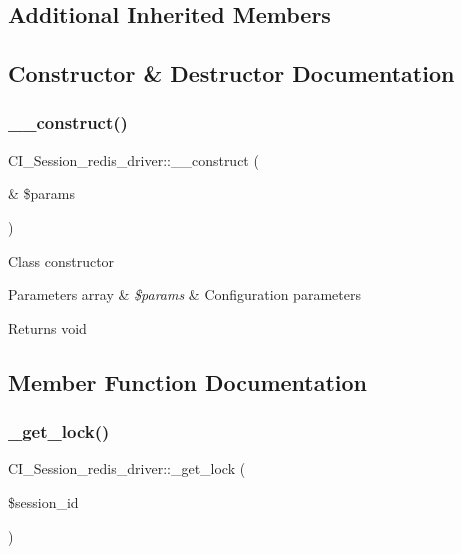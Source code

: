 \subsection*{Additional Inherited Members}


\subsection{Constructor \& Destructor Documentation}
\mbox{\label{class_c_i___session__redis__driver_aa37861b0b1953ec1958bcafb7ecdbca6}} 
\subsubsection{\texorpdfstring{\+\_\+\+\_\+construct()}{\_\_construct()}}
{\footnotesize\ttfamily C\+I\+\_\+\+Session\+\_\+redis\+\_\+driver\+::\+\_\+\+\_\+construct (\begin{DoxyParamCaption}\item[{\&}]{\$params }\end{DoxyParamCaption})}

Class constructor


\begin{DoxyParams}[1]{Parameters}
array & {\em \$params} & Configuration parameters \\
\hline
\end{DoxyParams}
\begin{DoxyReturn}{Returns}
void 
\end{DoxyReturn}


\subsection{Member Function Documentation}
\mbox{\label{class_c_i___session__redis__driver_a889facb2bb5293b10071ae09c64ef27a}} 
\subsubsection{\texorpdfstring{\+\_\+get\+\_\+lock()}{\_get\_lock()}}
{\footnotesize\ttfamily C\+I\+\_\+\+Session\+\_\+redis\+\_\+driver\+::\+\_\+get\+\_\+lock (\begin{DoxyParamCaption}\item[{}]{\$session\+\_\+id }\end{DoxyParamCaption})\hspace{0.3cm}{\ttfamily [protected]}}


